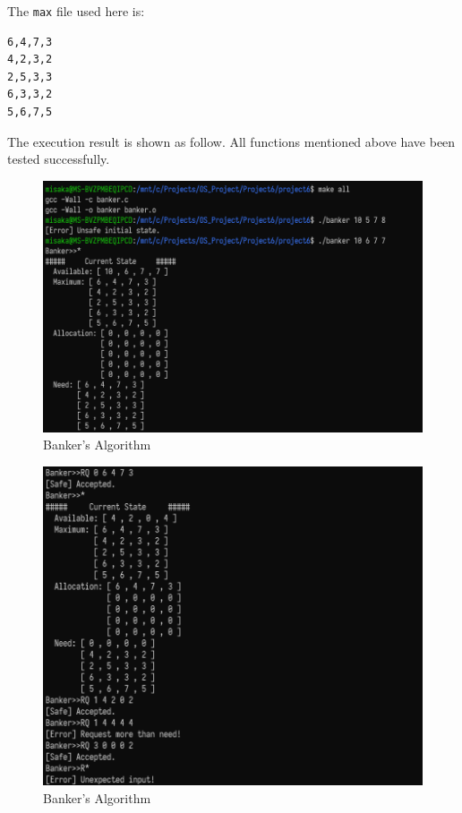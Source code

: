 \documentclass[UTF8,10pt,a4paper]{article}
\theoremstyle{Problem}
\theoremstyle{Solution}
\begin{document}
The \texttt{max} file used here is:

\begin{lstlisting}
6,4,7,3
4,2,3,2
2,5,3,3
6,3,3,2
5,6,7,5
\end{lstlisting}


The execution result is shown as follow. All functions mentioned above have been tested successfully. 

\begin{figure}[H]
    \centering
    \includegraphics[width=400pt]{1.png}
    \caption{Banker's Algorithm}
    \label{3}
\end{figure}

\begin{figure}[H]
    \centering
    \includegraphics[width=400pt]{2.png}
    \caption{Banker's Algorithm}
    \label{3}
\end{figure}
\end{document}
